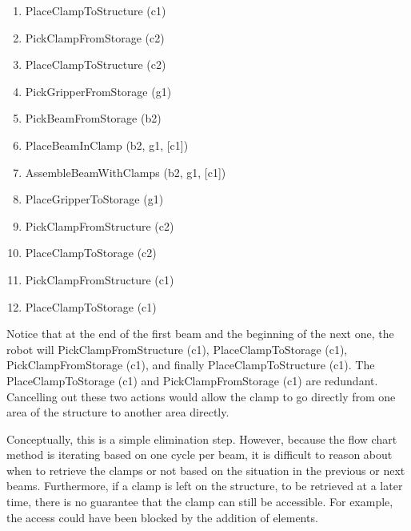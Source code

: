 {\begin{enumerate}
\begin{enumerate}
	\item {\footnotesize PlaceClampToStructure (c1)}

	\item {\footnotesize PickClampFromStorage (c2)}

	\item {\footnotesize PlaceClampToStructure (c2)}

	\item {\footnotesize PickGripperFromStorage (g1)}

	\item {\footnotesize PickBeamFromStorage (b2)}

	\item {\footnotesize PlaceBeamInClamp (b2, g1, [c1])}

	\item {\footnotesize AssembleBeamWithClamps (b2, g1, [c1])}

	\item {\footnotesize PlaceGripperToStorage (g1)}

	\item {\footnotesize PickClampFromStructure (c2)}

	\item {\footnotesize PlaceClampToStorage (c2)}

	\item {\footnotesize PickClampFromStructure (c1)}

	\item {\footnotesize PlaceClampToStorage (c1)}

\end{enumerate}
\end{enumerate}
Notice that at the end of the first beam and the beginning of the next one, the robot will PickClampFromStructure (c1), PlaceClampToStorage (c1), PickClampFromStorage (c1), and finally PlaceClampToStructure (c1). The PlaceClampToStorage (c1) and PickClampFromStorage (c1) are redundant. Cancelling out these two actions would allow the clamp to go directly from one area of the structure to another area directly.

Conceptually, this is a simple elimination step. However, because the flow chart method is iterating based on one cycle per beam, it is difficult to reason about when to retrieve the clamps or not based on the situation in the previous or next beams. Furthermore, if a clamp is left on the structure, to be retrieved at a later time, there is no guarantee that the clamp can still be accessible. For example, the access could have been blocked by the addition of elements. 

}

